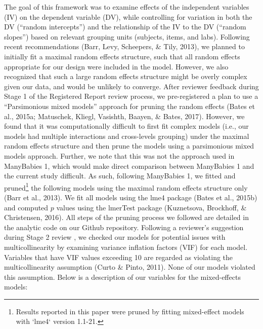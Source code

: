 \documentclass[,man,floatsintext]{apa6}
\begin{document}
The goal of this framework was to examine effects of the independent variables (IV) on the dependent variable (DV), while controlling for variation in both the DV (\enquote{random intercepts}) and the relationship of the IV to the DV (\enquote{random slopes}) based on relevant grouping units (subjects, items, and labs). Following recent recommendations (Barr, Levy, Scheepers, \& Tily, 2013), we planned to initially fit a maximal random effects structure, such that all random effects appropriate for our design were included in the model. However, we also recognized that such a large random effects structure might be overly complex given our data, and would be unlikely to converge. After reviewer feedback during Stage 1 of the Registered Report review process, we pre-registered a plan to use a \enquote{Parsimonious mixed models} approach for pruning the random effects (Bates et al., 2015a; Matuschek, Kliegl, Vasishth, Baayen, \& Bates, 2017). However, we found that it was computationally difficult to first fit complex models (i.e., our models had multiple interactions and cross-levels grouping) under the maximal random effects structure and then prune the models using a parsimonious mixed models approach. Further, we note that this was not the approach used in ManyBabies 1, which would make direct comparison between ManyBabies 1 and the current study difficult. As such, following ManyBabies 1, we fitted and pruned\footnote{Results reported in this paper were pruned by fitting mixed-effect models with `lme4` version 1.1-21.} the following models using the maximal random effects structure only (Barr et al., 2013). We fit all models using the lme4 package (Bates et al., 2015b) and computed \(p\) values using the lmerTest package (Kuznetsova, Brockhoff, \& Christensen, 2016). All steps of the pruning process we followed are detailed in the analytic code on our Github repository. Following a reviewer's suggestion during Stage 2 review , we checked our models for potential issues with multicollinearity by examining variance inflation factors (VIF) for each model. Variables that have VIF values exceeding 10 are regarded as violating the multicollinearity assumption (Curto \& Pinto, 2011). None of our models violated this assumption. Below is a description of our variables for the mixed-effects models:
\end{document}
